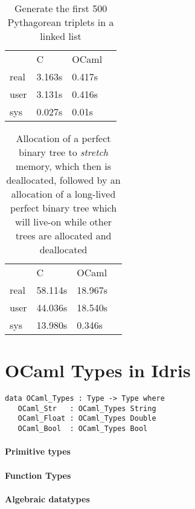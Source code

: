 \documentclass[a4paper,twocolumn]{article}
\begin{document}
\begin{table}
    \centering
    \caption{Generate the first 500 Pythagorean triplets in a linked list}
    \begin{tabular}{llll}\label{tab:pythagtab}
             & C      & OCaml  & \\
        real & 3.163s & 0.417s & \\
        user & 3.131s & 0.416s & \\
        sys  & 0.027s & 0.01s  &
    \end{tabular}
\end{table}


\begin{table}
    \centering
    \caption{Allocation of a perfect binary tree to \emph{stretch} memory, which then is deallocated, followed by an allocation of a long-lived perfect binary tree which will live-on while other trees are allocated and deallocated}
    \begin{tabular}{llll}\label{tab:bintreetab}
             & C       & OCaml   & \\
        real & 58.114s & 18.967s & \\
        user & 44.036s & 18.540s & \\
        sys  & 13.980s & 0.346s  &
    \end{tabular}
\end{table}





\section{OCaml Types in Idris}

\begin{lstlisting}
data OCaml_Types : Type -> Type where
   OCaml_Str   : OCaml_Types String
   OCaml_Float : OCaml_Types Double
   OCaml_Bool  : OCaml_Types Bool
\end{lstlisting}

\paragraph{Primitive types}



\paragraph{Function Types}

\paragraph{Algebraic datatypes}
\end{document}
